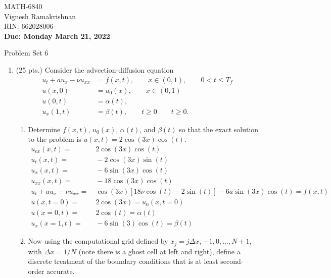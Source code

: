 \documentclass[11pt]{article}
\newcommand{\ut}{u_t}
\newcommand{\uxx}{u_{xx}}
\begin{document}
\begin{flushright}
\small{MATH-6840\\
Vignesh Ramakrishnan\\
RIN: 662028006 \\
{\bf Due: Monday March 21, 2022}}
\end{flushright}

\begin{center}
\large{Problem Set 6}\\
\end{center}

\begin{enumerate}
  \item (25 pts.) Consider the advection-diffusion equation
    \begin{align*}
      u_t+au_x- \nu u_{xx} & =f(x,t), \qquad x\in(0,1), \qquad 0 < t \le T_f\\
      u(x,0) & = u_0(x), \qquad x\in(0,1)\\
      u(0,t) & = \alpha(t), \qquad \\
      u_x(1,t) & = \beta(t), \qquad t\ge 0 \qquad t\ge 0.
    \end{align*}
    \begin{enumerate}
      \item {\color{red}Determine $f(x,t)$, $u_0(x)$, $\alpha(t)$, and $\beta(t)$ so that the exact solution to the problem is $u(x,t)=2\cos(3x)\cos(t)$.}
      \begin{align*}
      u_{ex}(x,t) =& \ 2\cos(3x)\cos(t) \\
      \ut(x,t) =& \ -2\cos(3x)\sin(t) \\
      u_x(x,t) =& \ -6\sin(3x)\cos(t) \\
      \uxx(x,t) =& \ -18\cos(3x)\cos(t) \\
      \ut + a u_x -\nu \uxx =& \ \cos(3x)\left[18\nu\cos(t) -2\sin(t)\right] -6a\sin(3x)\cos(t) = f(x,t) \\
      u(x,t=0) =& \ 2\cos(3x) = u_0(x,t=0) \\
      u(x=0,t) =& \ 2\cos(t) = \alpha(t) \\
      u_x(x=1,t) =& \ -6\sin(3)\cos(t) = \beta(t)
      \end{align*}
      \item {\color{red}Now using the computational grid defined by $x_j=j\Delta x$, $-1,0,\ldots,N+1$, with $\Delta x=1/N$ (note there is a ghost cell at left and right), define a discrete treatment of the boundary conditions that is at least second-order accurate.} 

\end{enumerate}
\end{enumerate}
\end{document}

